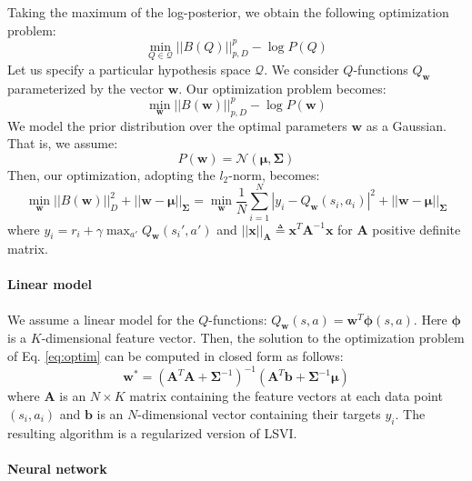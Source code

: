 \documentclass{article}
\begin{document}
Taking the maximum of the log-posterior, we obtain the following optimization problem:
\begin{equation}
\min_{Q\in\mathcal{Q}} ||B(Q)||_{p,D}^p - \log P(Q) 
\end{equation}
Let us specify a particular hypothesis space $\mathcal{Q}$. We consider $Q$-functions $Q_{\bm{w}}$ parameterized by the vector $\bm{w}$. Our optimization problem becomes:
\begin{equation}
\min_{\bm{w}} ||B(\bm{w})||_{p,D}^p - \log P(\bm{w}) 
\end{equation}
We model the prior distribution over the optimal parameters $\bm{w}$ as a Gaussian. That is, we assume:
\begin{equation}
P(\bm{w}) = \mathcal{N}(\bm{\mu},\bm{\Sigma})
\end{equation}
Then, our optimization, adopting the $l_2$-norm, becomes:
\begin{equation} \label{eq:optim}
\min_{\bm{w}} ||B(\bm{w})||_{D}^2 + ||\bm{w}-\bm{\mu}||_{\bm{\Sigma}} = \min_{\bm{w}} \frac{1}{N}\sum_{i=1}^N\left\lvert y_i - Q_{\bm{w}}(s_i,a_i) \right\rvert^2 + ||\bm{w}-\bm{\mu}||_{\bm{\Sigma}}
\end{equation}
where $y_i = r_i + \gamma\max_{a'}Q_{\bm{w}}(s_i',a')$ and $||\bm{x}||_{\bm{A}} \triangleq \bm{x}^T\bm{A}^{-1}\bm{x}$ for $\bm{A}$ positive definite matrix.

\paragraph{Linear model}

We assume a linear model for the $Q$-functions: $Q_{\bm{w}}(s,a) = \bm{w}^T\bm{\phi}(s,a)$. Here $\bm{\phi}$ is a $K$-dimensional feature vector. Then, the solution to the optimization problem of Eq. \eqref{eq:optim} can be computed in closed form as follows:
\begin{equation}
\bm{w}^* = \left( \bm{A}^T\bm{A} + \bm{\Sigma}^{-1} \right)^{-1} \left( \bm{A}^T\bm{b} + \bm{\Sigma}^{-1}\bm{\mu} \right) 
\end{equation}
where $\bm{A}$ is an $N\times K$ matrix containing the feature vectors at each data point $(s_i,a_i)$ and $\bm{b}$ is an $N$-dimensional vector containing their targets $y_i$. The resulting algorithm is a regularized version of LSVI.

\paragraph{Neural network}
\end{document}
